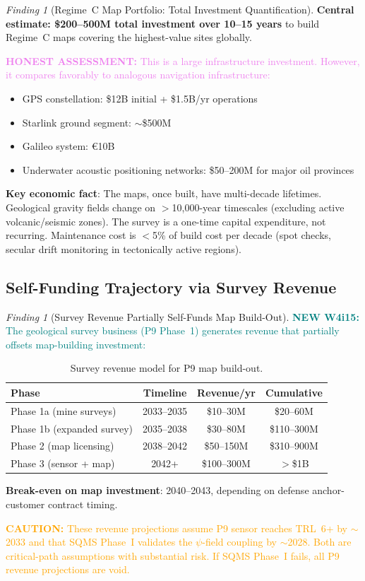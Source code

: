 \documentclass[11pt]{article}
\theoremstyle{definition}
\theoremstyle{remark}
\newtheorem{finding}[theorem]{Finding}
\newcommand{\caution}[1]{\textcolor{orange}{\textbf{CAUTION:} #1}}
\newcommand{\honest}[1]{\textcolor{violet}{\textbf{HONEST ASSESSMENT:} #1}}
\newcommand{\newfinding}[1]{\textcolor{teal}{\textbf{NEW W4i15:} #1}}
\begin{document}
\begin{finding}[Regime~C Map Portfolio: Total Investment Quantification]
\textbf{Central estimate: \$200--500M total investment over 10--15 years}
to build Regime~C maps covering the highest-value sites globally.

\honest{This is a large infrastructure investment. However, it compares
favorably to analogous navigation infrastructure:}
\begin{itemize}[nosep]
\item GPS constellation: \$12B initial + \$1.5B/yr operations
\item Starlink ground segment: $\sim$\$500M
\item Galileo system: \euro10B
\item Underwater acoustic positioning networks: \$50--200M for major
  oil provinces
\end{itemize}

\textbf{Key economic fact}: The maps, once built, have multi-decade
lifetimes. Geological gravity fields change on $>$10,000-year
timescales (excluding active volcanic/seismic zones). The survey
is a one-time capital expenditure, not recurring. Maintenance cost
is $<$5\% of build cost per decade (spot checks, secular drift
monitoring in tectonically active regions).
\end{finding}

\subsection{Self-Funding Trajectory via Survey Revenue}

\begin{finding}[Survey Revenue Partially Self-Funds Map Build-Out]
\label{find:self-funding}
\newfinding{The geological survey business (P9 Phase~1) generates
revenue that partially offsets map-building investment:}

\begin{table}[H]
\centering
\caption{Survey revenue model for P9 map build-out.}
\label{tab:survey-revenue}
\begin{tabular}{@{}lccc@{}}
\toprule
Phase & Timeline & Revenue/yr & Cumulative \\
\midrule
Phase 1a (mine surveys) & 2033--2035 & \$10--30M & \$20--60M \\
Phase 1b (expanded survey) & 2035--2038 & \$30--80M & \$110--300M \\
Phase 2 (map licensing) & 2038--2042 & \$50--150M & \$310--900M \\
Phase 3 (sensor + map) & 2042+ & \$100--300M & $>$\$1B \\
\bottomrule
\end{tabular}
\end{table}

\textbf{Break-even on map investment}: 2040--2043, depending on
defense anchor-customer contract timing.

\caution{These revenue projections assume P9 sensor reaches TRL~6+
by $\sim$2033 and that SQMS Phase~I validates the $\psi$-field
coupling by $\sim$2028. Both are critical-path assumptions with
substantial risk. If SQMS Phase~I fails, all P9 revenue projections
are void.}
\end{finding}
\end{document}
